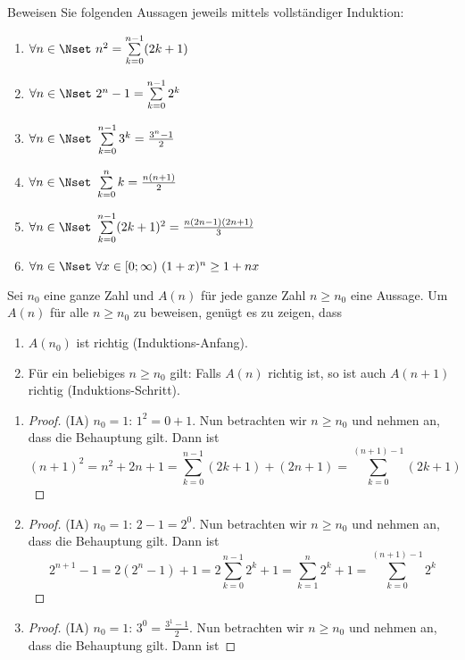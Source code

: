 \documentclass[12pt]{exam}
\begin{document}
\begin{questions}
Beweisen Sie folgenden Aussagen jeweils mittels vollständiger Induktion:\\
\parbox{0.5\textwidth}{\begin{enumerate}
		\item $\forall n\in\Nset~n^2=\sum\limits_{k=0}^{n-1} (2k+1)$
		\item $\forall n\in\Nset~ 2^n-1=\sum\limits_{k=0}^{n-1} 2^k$
		\item $\forall n\in\Nset~\sum\limits_{k=0}^{n-1} 3^k = \frac{3^n-1}{2}$ 
\end{enumerate}}\parbox{0.5\textwidth}{\begin{enumerate}\setcounter{enumi}{3}
		\item $\forall n\in\Nset~\sum\limits_{k=0}^n k=\frac{n(n+1)}{2}$ 
		\item $\forall n\in\Nset~\sum\limits_{k=0}^{n-1} (2k+1)^2=\frac{n(2n-1)(2n+1)}{3}$
		\item $\forall n\in\Nset~\forall x\in[0;\infty)~(1+x)^n\ge 1+nx$
\end{enumerate}}
\begin{solution}
	Sei $n_0$ eine ganze Zahl und $A(n)$ für jede ganze Zahl $n\geq n_0$ eine Aussage. Um $A(n)$ für alle $n\geq n_0$ zu beweisen, genügt es zu zeigen, dass
	\begin{enumerate}
		\item[(IA)] $A(n_0)$ ist richtig (Induktions-Anfang).
		\item[(IS)] Für ein beliebiges $n\geq n_0$ gilt: Falls $A(n)$ richtig ist, so ist auch $A(n+1)$ richtig (Induktions-Schritt).
	\end{enumerate}
	\begin{enumerate}
		\item \begin{proof}
			(IA) $n_0=1$: $1^2=0+1$\checkmark. Nun betrachten wir $n\geq n_0$ und nehmen an, dass die Behauptung gilt. Dann ist
			\[(n+1)^2=n^2+2n+1=\sum\limits_{k=0}^{n-1} (2k+1)+(2n+1)=\sum\limits_{k=0}^{(n+1)-1} (2k+1)
			\]
		\end{proof}
		\item \begin{proof}
			(IA) $n_0=1$: $2-1=2^0$\checkmark. Nun betrachten wir $n\geq n_0$ und nehmen an, dass die Behauptung gilt. Dann ist
			\[2^{n+1}-1=2(2^n-1)+1=2\sum\limits_{k=0}^{n-1} 2^k+1=\sum\limits_{k=1}^{n} 2^k+1=\sum\limits_{k=0}^{(n+1)-1} 2^k
			\]
		\end{proof}
		\item \begin{proof}
			(IA) $n_0=1$: $3^0=\frac{3^1-1}{2}$\checkmark. Nun betrachten wir $n\geq n_0$ und nehmen an, dass die Behauptung gilt. Dann ist

\end{proof}
\end{enumerate}
\end{solution}
\end{questions}
\end{document}
